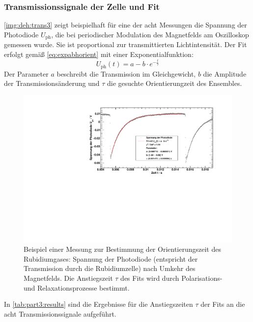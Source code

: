 \subsubsection*{Transmissionssignale der Zelle und Fit}
\autoref{img:deh:trans3} zeigt beispielhaft für eine der acht Messungen
die Spannung der Photodiode $U_{\text{ph}}$,
die bei periodischer Modulation des Magnetfelds am Oszilloskop gemessen wurde.
Sie ist proportional zur transmittierten Lichtintensität.
Der Fit erfolgt gemäß \autoref{eq:expabhorient} mit einer Exponentialfunktion:
\begin{equation}
  U_{\text{ph}}(t)=a - b \cdot e^{-\frac{t}{\tau}}
\end{equation}
Der Parameter $a$ beschreibt die Transmission im Gleichgewicht, $b$ die Amplitude der
Transmissionsänderung und $\tau$ die gesuchte Orientierungzeit des Ensembles.

\begin{figure}[H]
\begin{center}
  \includegraphics[width=\textwidth]{../img/part5/65-5mA-10.pdf}
  \caption{Beispiel einer Messung zur Bestimmung der Orientierungszeit des Rubidiumgases:
  Spannung der Photodiode (entspricht der Transmission durch die Rubidiumzelle)
  nach Umkehr des Magnetfelds.
  Die Anstiegszeit $\tau$ des Fits wird durch Polarisations- und Relaxationsprozesse bestimmt.}
  \label{img:deh:trans3}
\end{center}
\end{figure}


In \autoref{tab:part3:results} sind die Ergebnisse für die Anstiegszeiten $\tau$
der Fits an die acht Transmissionssignale aufgeführt.

